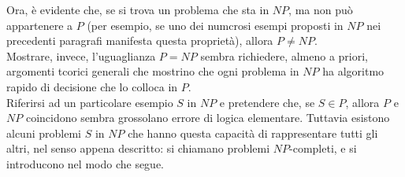 Ora, è evidente che, se si trova un problema che sta in $N P$, ma non può
appartenere a $P$ (per esempio, se uno dei numcrosi esempi proposti in $N P$ nei
precedenti paragrafi manifesta questa proprietà), allora $P \neq N P$.\\
Mostrare, invece, l'uguaglianza $P=N P$ sembra richiedere, almeno a priori,
argomenti tcorici generali che mostrino che ogni problema in $N P$ ha algoritmo
rapido di decisione che lo colloca in $P$.\\
Riferirsi ad un particolare esempio $S$ in $N P$ e pretendere che, se $S \in P$,
allora $P$ e $N P$ coincidono sembra grossolano errore di logica elementare.
Tuttavia esistono alcuni problemi $S$ in $N P$ che hanno questa capacità di
rappresentare tutti gli altri, nel senso appena descritto: si chiamano problemi
$N P$-completi, e si introducono nel modo che segue.
